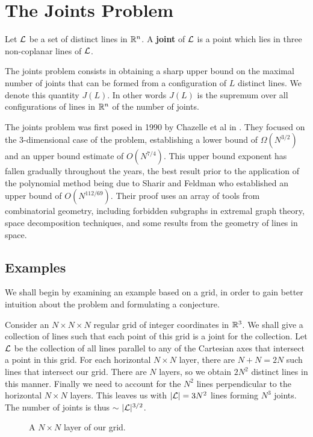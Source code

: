 \chapter{The Joints Problem \label{chap:joints}}
\begin{definition}
    Let $\mathcal L$ be a set of distinct lines in $\mathbb R^n$. A \textbf{joint} of $\mathcal L$ is a point which lies in three non-coplanar lines of $\mathcal L$.
\end{definition}
The joints problem consists in obtaining a sharp upper bound on the maximal number of joints that can be formed from a configuration of $L$ distinct lines.
We denote this quantity $J(L)$. In other words $J(L)$ is the supremum over all configurations of lines in $\mathbb R^n$ of the number of joints.

The joints problem was first posed in 1990 by Chazelle et al in \cite{chazelle1990counting}. They focused on the 3-dimensional case of the problem, establishing a lower bound of $\Omega (N^{3/2})$ and an upper bound estimate of $O(N^{7/4})$. 
This upper bound exponent has fallen gradually throughout the years, the best result prior to the application of the polynomial method being due to Sharir and Feldman who established an upper bound of $O(N^{112/69})$. Their
proof uses an array of tools from combinatorial geometry, including forbidden subgraphs in extremal graph theory, space decomposition techniques, and some results from the geometry of lines in space.

\section{Examples}
We shall begin by examining an example based on a grid, in order to gain better intuition about the problem and formulating a conjecture. 
\begin{example}Consider an $N \times N \times N$ regular grid of integer coordinates in $\mathbb R^3$. We shall give a collection of lines such that each point of this grid is a joint for the collection.
Let $\mathcal L$ be the collection of all lines parallel to any of the Cartesian axes that intersect a point in this grid.
For each horizontal $N \times N$ layer, there are $N+N = 2N$ such lines that intersect our grid. 
There are $N$ layers, so we obtain $2N^2$ distinct lines in this manner. Finally we need to account for the $N^2$ lines perpendicular to the horizontal $N\times N$ layers.
This leaves us with $|\mathcal L| = 3 N^2$ lines forming $N^3$ joints. The number of joints is thus $\sim$ $|\mathcal L|^{3/2}$. 
\end{example}
\begin{figure}[h]
    \centering
{}
\caption{A $N \times N$ layer of our grid.}
\end{figure}

